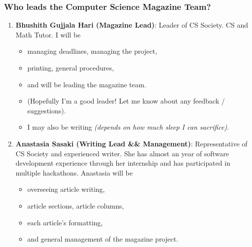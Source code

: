\documentclass{beamer}
\begin{document}
\begin{frame}
    \frametitle{Who leads the Computer Science Magazine Team?}

    \begin{enumerate}

        \item<1-> 
            \textbf{Bhushith Gujjala Hari (Magazine Lead)}: \small{Leader of CS Society. CS and Math Tutor}. 
            \pause I will be 

            \begin{itemize}

                \item<3-> managing deadlines, managing the project, 
                \item<4-> printing, general procedures, 
                \item<5-> and will be leading the magazine team. 
                \item<6-> (Hopefully I'm a good leader! Let me know about any feedback / suggestions). 
                \item<7-> I may also be writing \emph{(depends on how much sleep I can sacrifice)}.

            \end{itemize}

        \item<8-> 
            \textbf{Anastasia Sasaki (Writing Lead \&\& Management)}: \small{Representative of CS Society and experienced writer. She has almost an year of software development experience through her internship and has participated in multiple hackathons}. 
            \pause
            Anastasia will be 

            \begin{itemize}

                \item<9-> overseeing article writing, 
                \item<10-> article sections, article columns, 
                \item<11-> each article's formatting, 
                \item<12-> and general management of the magazine project. 

            \end{itemize}

    \end{enumerate}

\end{frame}
\end{document}
